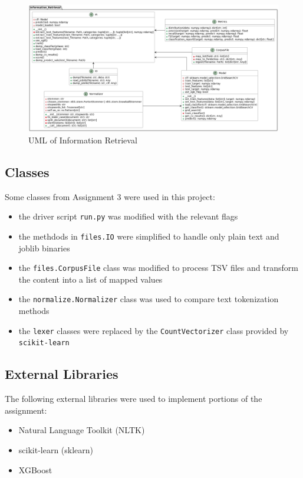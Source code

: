 \documentclass[11pt]{article}
\begin{document}
\begin{figure}[!ht]
    \includegraphics[scale=0.35]{statics/uml.png}
    \centering
    \caption{UML of Information Retrieval}
\end{figure}

\subsection{Classes}
Some classes from Assignment 3 were used in this project:
\begin{itemize}
    \item the driver script \texttt{run.py} was modified with the relevant flags
    \item the methdods in \texttt{files.IO} were simplified to handle only plain text and joblib binaries
    \item the \texttt{files.CorpusFile} class was modified to process TSV files and transform the content into a list of mapped values
    \item the \texttt{normalize.Normalizer} class was used to compare text tokenization methods
    \item the \texttt{lexer} classes were replaced by the \texttt{CountVectorizer} class provided by \texttt{scikit-learn}
\end{itemize}

\subsection{External Libraries}
The following external libraries were used to implement portions of the assignment:
\begin{itemize}
    \item Natural Language Toolkit (NLTK) \cite{bird2009natural}
    \item scikit-learn (sklearn) \cite{scikit-learn}
    \item XGBoost \cite{Chen_2016}
\end{itemize}
\end{document}
